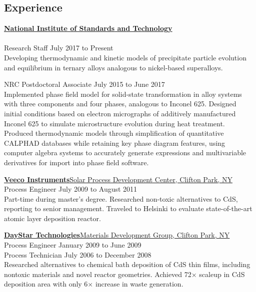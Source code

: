 \documentclass[margin]{res}
\begin{document}
\begin{resume}
\baselineskip
\section{Experience}
{\bf \href{https://www.nist.gov}{National Institute of Standards and Technology}}\\
 \\
 Research Staff \hfill July 2017 to Present\\
 [0.25\baselineskip]
Developing thermodynamic and kinetic models of precipitate particle evolution and equilibrium in ternary alloys analogous to nickel-based superalloys.

 NRC Postdoctoral Associate \hfill July 2015 to June 2017\\
 [0.25\baselineskip]
Implemented phase field model for solid-state transformation in alloy systems with three components and four phases, analogous to Inconel 625. Designed initial conditions based on electron micrographs of additively manufactured Inconel 625 to simulate microstructure evolution during heat treatment. Produced thermodynamic models through simplification of quantitative CALPHAD databases while retaining key phase diagram features, using computer algebra systems to accurately generate expressions and multivariable derivatives for import into phase field software.

 {\bf \href{https://www.veeco.com}{Veeco Instruments}}\hfill \href{https://www.veeco.com/company/news/veeco-establishes-solar-process-development-center}{Solar Process Development Center, Clifton Park, NY}\\
 Process Engineer \hfill July 2009 to August 2011\\
 [0.25\baselineskip]
Part-time during master's degree. Researched non-toxic alternatives to CdS, reporting to senior management. Traveled to Helsinki to evaluate state-of-the-art atomic layer deposition reactor.

 {\bf \href{https://web.archive.org/web/20090209214859/http://daystartech.com/}{DayStar Technologies}}\hfill \href{https://web.archive.org/web/20090209214859/http://daystartech.com/}{Materials Development Group, Clifton Park, NY}\\
 Process Engineer \hfill January 2009 to June 2009\\
 Process Technician \hfill July 2006 to December 2008\\
 [0.25\baselineskip]
Researched alternatives to chemical bath deposition of CdS thin films, including nontoxic materials and novel reactor geometries. Achieved 72$\times$ scaleup in CdS deposition area with only 6$\times$ increase in waste generation.


\end{resume}
\end{document}
